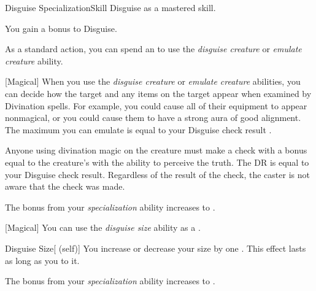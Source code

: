     \begin{feat}{Disguise Specialization}{Skill}
        \featpre Disguise as a mastered skill.

         You gain a  bonus to Disguise.

         As a standard action, you can spend an  to use the \textit{disguise creature} or \textit{emulate creature} ability.

        [Magical] When you use the \textit{disguise creature} or \textit{emulate creature} abilities, you can decide how the target and any items on the target appear when examined by Divination spells.
        For example, you could cause all of their equipment to appear nonmagical, or you could cause them to have a strong aura of good alignment.
        The maximum  you can emulate is equal to your Disguise check result .

        Anyone using divination magic on the creature must make a check with a bonus equal to the creature's  with the ability to perceive the truth.
        The DR is equal to your Disguise check result.
        Regardless of the result of the check, the caster is not aware that the check was made.

         The bonus from your \textit{specialization} ability increases to .

        [Magical] You can use the \textit{disguise size} ability as a .
        \begin{attuneability}{Disguise Size}[ (self)]
            You increase or decrease your size by one .
            This effect lasts as long as you  to it.
        \end{attuneability}

         The bonus from your \textit{specialization} ability increases to .
    \end{feat}

